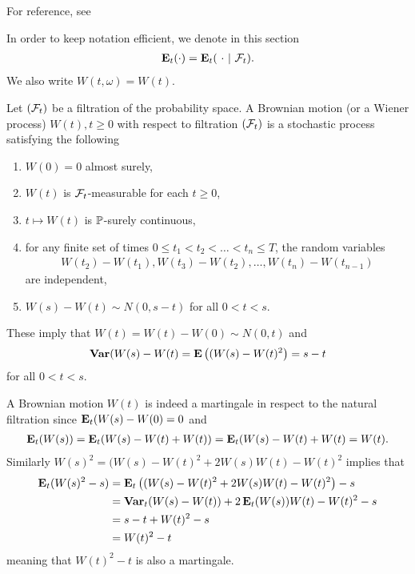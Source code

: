 For reference, see \textcite[pp. 530--545]{billingsley2012probabilityandmeasure}

In order to keep notation efficient, we denote in this section
	\begin{align}
		\operatorname{\boldsymbol{\mathrm{E}}}_t( \cdot ) = \operatorname{\boldsymbol{\mathrm{E}}}_t( \ \cdot \ | \ \mathcal{F}_t ) .
	\end{align}
We also write $W(t, \omega) = W(t)$.

Let $(\mathcal{F}_t)$ be a filtration of the probability space. A Brownian motion (or a Wiener process) $W(t), t \geq 0$ with respect to filtration $(\mathcal{F}_t)$ is a stochastic process satisfying the following
  \begin{enumerate}
    \item $W(0) = 0$ almost surely,
    \item $W(t)$ is $\mathcal{F}_t$-measurable for each $ t\geq 0$,
    \item $t \mapsto W(t)$ is $\mathbb{P}$-surely continuous,
    \item for any finite set of times $0 \leq t_1 < t_2 < \ldots < t_n \leq T$, the random variables
      \begin{align}
        W(t_2) - W(t_1), W(t_3) - W(t_2), \ldots , W(t_n) - W(t_{n-1})
      \end{align}
      are independent,
    \item $W(s) - W(t) \sim N(0, s-t)$ for all $0 < t < s$.
  \end{enumerate}
These imply that $W(t) = W(t) - W(0) \sim N(0,t)$ and
  \begin{align}
    \operatorname{\boldsymbol{\mathrm{Var}}} (W(s) - W(t) = \operatorname{\boldsymbol{\mathrm{E}}} \left( (W(s) - W(t)^2 \right) = s - t
  \end{align}
for all $0 < t < s$.

A Brownian motion $W(t)$ is indeed a martingale in respect to the natural filtration since $\operatorname{\boldsymbol{\mathrm{E}}}_t ( W(s) - W(0 ) = 0$ and
  \begin{align}
    \operatorname{\boldsymbol{\mathrm{E}}}_t ( W(s) ) = \operatorname{\boldsymbol{\mathrm{E}}}_t ( W(s) - W(t) + W(t) ) = \operatorname{\boldsymbol{\mathrm{E}}}_t ( W(s) - W(t ) + W(t) = W(t) .
  \end{align}
Similarly $W(s)^2 = (W(s) - W(t)^2 + 2W(s)W(t) - W(t)^2$ implies that
  \begin{align}
    \operatorname{\boldsymbol{\mathrm{E}}}_t ( W(s)^2 -s ) &= \operatorname{\boldsymbol{\mathrm{E}}}_t \left( (W(s) - W(t)^2 + 2W(s)W(t) - W(t)^2 \right) -s \\
      &= \operatorname{\boldsymbol{\mathrm{Var}}}_t (W(s) - W(t)) + 2 \operatorname{\boldsymbol{\mathrm{E}}}_t (W(s)) W(t) - W(t)^2 - s \\
      &= s-t + W(t)^2 - s \\ &= W(t)^2 -t
  \end{align}
meaning that $W(t)^2 - t$ is also a martingale.

